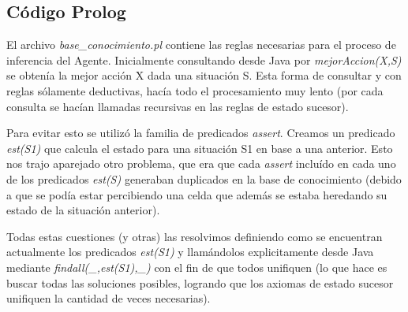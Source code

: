 \subsection{Código Prolog}

El archivo \emph{base\_conocimiento.pl} contiene las reglas necesarias para el
proceso de inferencia del Agente. Inicialmente consultando desde Java por \linebreak
\emph{mejorAccion(X,S)} se obtenía la mejor acción X dada una situación S. Esta
forma de consultar y con reglas sólamente deductivas, hacía todo el
procesamiento muy lento (por cada consulta se hacían llamadas recursivas en las
reglas de estado sucesor).

Para evitar esto se utilizó la familia de predicados \emph{assert}.
Creamos un predicado \emph{est(S1)} que calcula el estado para una situación
S1 en base a una anterior. Esto nos trajo aparejado otro problema, que era
que cada \emph{assert} incluído en cada uno de los predicados \emph{est(S)} 
generaban duplicados en la base de conocimiento (debido a que se podía estar
 percibiendo una celda que además se estaba heredando su estado de la situación
 anterior). 

Todas estas cuestiones (y otras) las resolvimos definiendo como se encuentran
 actualmente los predicados \emph{est(S1)} y llamándolos explicitamente desde
 Java mediante \emph{findall(\_,est(S1),\_)} con el fin de que todos unifiquen (lo que hace es buscar todas las soluciones posibles, logrando que los axiomas de estado sucesor unifiquen la cantidad de veces necesarias).
